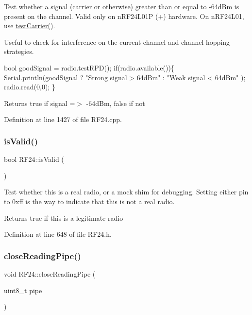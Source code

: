 Test whether a signal (carrier or otherwise) greater than or equal to -\/64d\+Bm is present on the channel. Valid only on n\+R\+F24\+L01P (+) hardware. On n\+R\+F24\+L01, use \hyperlink{classRF24_ad0d522ccf39493510e64bf1740be790d}{test\+Carrier()}.

Useful to check for interference on the current channel and channel hopping strategies.


\begin{DoxyCode}
\textcolor{keywordtype}{bool} goodSignal = radio.testRPD();
\textcolor{keywordflow}{if}(radio.available())\{
   Serial.println(goodSignal ? \textcolor{stringliteral}{"Strong signal > 64dBm"} : \textcolor{stringliteral}{"Weak signal < 64dBm"} );
   radio.read(0,0);
\}
\end{DoxyCode}
 \begin{DoxyReturn}{Returns}
true if signal =$>$ -\/64d\+Bm, false if not 
\end{DoxyReturn}


Definition at line 1427 of file R\+F24.\+cpp.

\mbox{\label{classRF24_a35e5f1533b7753806c42b76e782d917e}} 
\subsubsection{\texorpdfstring{is\+Valid()}{isValid()}}
{\footnotesize\ttfamily bool R\+F24\+::is\+Valid (\begin{DoxyParamCaption}{ }\end{DoxyParamCaption})\hspace{0.3cm}{\ttfamily [inline]}}

Test whether this is a real radio, or a mock shim for debugging. Setting either pin to 0xff is the way to indicate that this is not a real radio.

\begin{DoxyReturn}{Returns}
true if this is a legitimate radio 
\end{DoxyReturn}


Definition at line 648 of file R\+F24.\+h.

\mbox{\label{classRF24_a9944d93994a80037e3586f340f5e0107}} 
\subsubsection{\texorpdfstring{close\+Reading\+Pipe()}{closeReadingPipe()}}
{\footnotesize\ttfamily void R\+F24\+::close\+Reading\+Pipe (\begin{DoxyParamCaption}\item[{uint8\+\_\+t}]{pipe }\end{DoxyParamCaption})}

